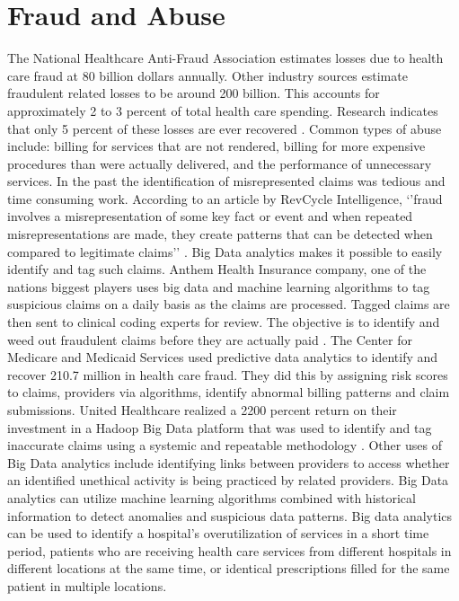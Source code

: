 \documentclass[sigconf]{acmart}
\begin{document}
\section{Fraud and Abuse}
The National Healthcare Anti-Fraud Association estimates losses due to health care fraud at 80 billion dollars annually. Other industry sources estimate fraudulent related losses to be around 200 billion. This accounts for approximately 2 to 3 percent of total health care spending. Research indicates that only 5 percent of these losses are ever recovered \cite{www-google-datameer}.
Common types of abuse include: billing for services that are not rendered, billing for more expensive procedures than were actually delivered, and the performance of unnecessary services. 
In the past the identification of misrepresented claims was tedious and time consuming work.  According to an article by RevCycle Intelligence, ‘’fraud involves a misrepresentation of some key fact or event and when repeated misrepresentations are made, they create patterns that can be detected when compared to legitimate claims’’ \cite{www-google-datameer}.  Big Data analytics makes it possible to easily identify and tag such claims. Anthem Health Insurance company, one of the nations biggest players uses big data and machine learning algorithms to tag suspicious claims on a daily basis as the claims are processed. Tagged claims are then sent to clinical coding experts for review. The objective is to identify and weed out fraudulent claims before they are actually paid \cite{www-google-datameer}.   
The Center for Medicare and Medicaid Services used predictive data analytics to identify and recover 210.7 million in health care fraud. They did this by assigning risk scores to claims, providers via algorithms, identify abnormal billing patterns and claim submissions.  United Healthcare realized a 2200 percent return on their investment in a Hadoop Big Data platform that was used to identify and tag inaccurate claims using a systemic and repeatable methodology \cite{www-google-McDonald}.
Other uses of Big Data analytics include identifying links between providers to access whether an identified unethical activity is being practiced by related providers.  Big Data analytics can utilize machine learning algorithms combined with historical information to detect anomalies and suspicious data patterns. Big data analytics can be used to identify a hospital’s overutilization of services in a short time period, patients who are receiving health care services from different hospitals in different locations at the same time, or identical prescriptions filled for the same patient in multiple locations.
 
\end{document}
